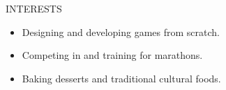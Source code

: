 
\begin{ResumeSection}{INTERESTS}
    \begin{itemize}
        \item Designing and developing games from scratch.
        \vspace{-0.5em}
        \item Competing in and training for marathons.
        \vspace{-0.5em}
        \item Baking desserts and traditional cultural foods.
    \end{itemize} 
\end{ResumeSection}